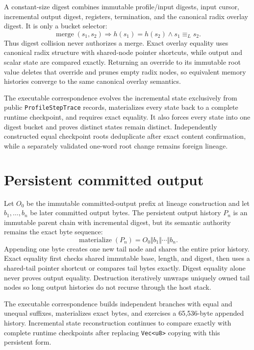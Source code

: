 \documentclass{article}
\begin{document}
A constant-size digest combines immutable profile/input digests, input cursor,
incremental output digest, registers, termination, and the canonical radix
overlay digest. It is only a bucket selector:
\begin{equation}
  \operatorname{merge}(s_1,s_2)
  \Longrightarrow
  h(s_1)=h(s_2)\land s_1\equiv_L s_2.
  \label{eq:state-graph-incremental-collision-guard}
\end{equation}
Thus digest collision never authorizes a merge. Exact overlay equality uses
canonical radix structure with shared-node pointer shortcuts, while output and
scalar state are compared exactly. Returning an override to its immutable root
value deletes that override and prunes empty radix nodes, so equivalent memory
histories converge to the same canonical overlay semantics.

The executable correspondence evolves the incremental state exclusively from
public \texttt{ProfileStepTrace} records, materializes every state back to a
complete
runtime checkpoint, and requires exact equality. It also forces every state into
one digest bucket and proves distinct states remain distinct. Independently
constructed equal checkpoint roots deduplicate after exact content confirmation,
while a separately validated one-word root change remains foreign lineage.

\section{Persistent committed output}

Let $O_0$ be the immutable committed-output prefix at lineage construction and
let $b_1,\ldots,b_n$ be later committed output bytes. The persistent output
history $P_n$ is an immutable parent chain with incremental digest, but its
semantic authority remains the exact byte sequence:
\begin{equation}
  \operatorname{materialize}(P_n)=O_0\Vert b_1\Vert\cdots\Vert b_n.
  \label{eq:state-graph-persistent-output}
\end{equation}
Appending one byte creates one new tail node and shares the entire prior
history.
Exact equality first checks shared immutable base, length, and digest, then uses
a
shared-tail pointer shortcut or compares tail bytes exactly. Digest equality
alone never proves output equality. Destruction iteratively unwraps uniquely
owned tail nodes so long output histories do not recurse through the host stack.

The executable correspondence builds independent branches with equal and unequal
suffixes, materializes exact bytes, and exercises a 65,536-byte appended
history.
Incremental state reconstruction continues to compare exactly with complete
runtime checkpoints after replacing \texttt{Vec<u8>} copying with this
persistent form.
\end{document}
